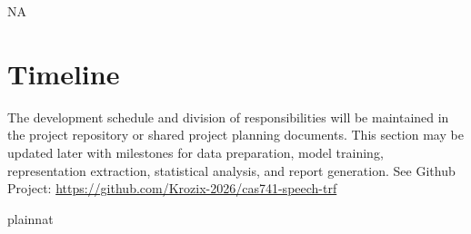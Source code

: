 \documentclass[12pt, titlepage]{article}
\begin{document}

NA


\section{Timeline}


The development schedule and division of responsibilities will be maintained in the project repository or shared project planning documents. This section may be updated later with milestones for data preparation, model training, representation extraction, statistical analysis, and report generation.
See Github Project: \url{https://github.com/Krozix-2026/cas741-speech-trf}


 {plainnat}


\newpage{}
\end{document}
